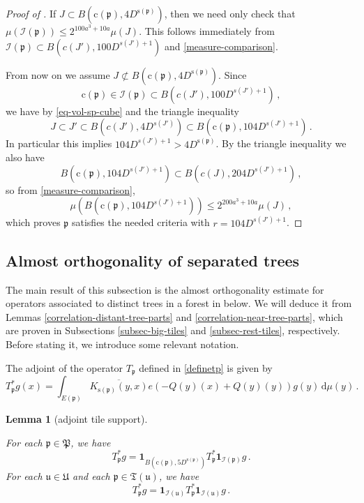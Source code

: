 \documentclass[10pt,a4paper]{article}
\theoremstyle{plain}
\newtheorem{lemma}[theorem]{Lemma}
\theoremstyle{definition}
\numberwithin{equation}{subsection}
\newcommand{\fp}{{\mathfrak p}}
\newcommand{\fP}{{\mathfrak P}}
\newcommand{\fu}{{\mathfrak u}}
\newcommand{\fU}{{\mathfrak U}}
\newcommand{\fT}{{\mathfrak T}}
\newcommand{\pc}{{\mathrm{c}}}
\newcommand{\ps}{{\mathrm{s}}}
\newcommand{\scI}{{\mathcal{I}}} %
\newcommand{\tQ}{{Q}}
\newcommand{\lean}[1]{}
\newcommand{\uses}[1]{}
\newcommand{\leanok}{}
\begin{document}
\begin{proof}[Proof of ]
    If $J \subset B(\pc(\fp), 4 D^{\ps(\fp)})$, then we need only check that
    $\mu(\scI(\fp)) \le 2^{100a^3 + 10a} \mu(J)$. This follows immediately from
    $\scI(\fp) \subset B(c(J'), 100 D^{s(J') + 1})$ and \eqref{measure-comparison}.

    From now on we assume $J \not \subset B(\pc(\fp), 4 D^{\ps(\fp)})$. Since
    \begin{equation*}
        \pc(\fp) \in \scI(\fp) \subset B(c(J'), 100 D^{s(J') + 1})\, ,
    \end{equation*}
    we have by \eqref{eq-vol-sp-cube} and the triangle inequality
    $$
        J \subset J' \subset B(c(J'), 4D^{s(J')}) \subset B(\pc(\fp), 104 D^{s(J') + 1})\,.
    $$
    In particular this implies $104 D^{s(J') + 1} > 4D^{\ps(\fp)}$. By the triangle inequality
    we also have
    $$
        B(\pc(\fp), 104 D^{s(J') + 1}) \subset B(c(J), 204 D^{s(J') + 1})\,,
    $$
    so from \eqref{measure-comparison},
    $$
        \mu( B(\pc(\fp), 104 D^{s(J') + 1})) \le 2^{200a^3 + 10a} \mu(J)\,,
    $$
    which proves $\fp$ satisfies the needed criteria with $r=104 D^{s(J') + 1}$.

\end{proof}

\subsection{Almost orthogonality of separated trees}

The main result of this subsection is the almost orthogonality estimate for operators associated to distinct trees in a forest in  below. We will deduce it from Lemmas \ref{correlation-distant-tree-parts} and \ref{correlation-near-tree-parts}, which are proven in Subsections \ref{subsec-big-tiles} and \ref{subsec-rest-tiles}, respectively. Before stating it, we introduce some relevant notation.

The adjoint of the operator $T_{\fp}$ defined in \eqref{definetp} is given by
\begin{equation}
    \label{definetp*}
    T_{\fp}^* g(x) = \int_{E(\fp)} \overline{K_{\ps(\fp)}(y,x)} e(-\tQ(y)(x)+ \tQ(y)(y)) g(y) \, \mathrm{d}\mu(y)\,.
\end{equation}

\begin{lemma}[adjoint tile support]
    \label{adjoint-tile-support}
    \uses{kernel-summand}
    \leanok
    \lean{TileStructure.Forest.adjoint_tile_support1, TileStructure.Forest.adjoint_tile_support2}
    For each $\fp \in \fP$, we have
    $$
        T_{\fp}^* g = \mathbf{1}_{B(\pc(\fp), 5D^{\ps(\fp)})} T_{\fp}^* \mathbf{1}_{\scI(\fp)} g\,.
    $$
    For each $\fu \in \fU$ and each $\fp \in \fT(\fu)$, we have
    $$
        T_{\fp}^* g = \mathbf{1}_{\scI(\fu)} T_{\fp}^* \mathbf{1}_{\scI(\fu)} g\,.
    $$
\end{lemma}
\end{document}
